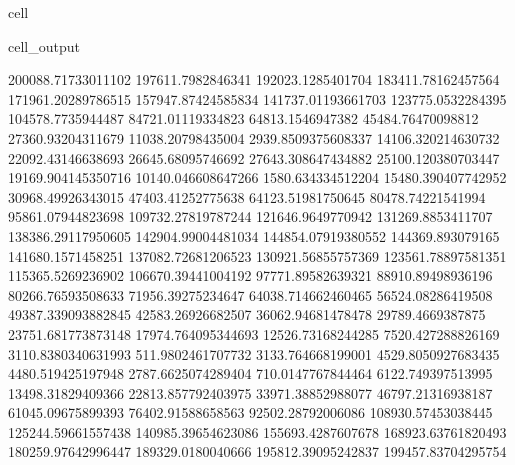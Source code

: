 \documentclass[letterpaper,10pt,english]{jupyterBook}
\begin{document}
\begin{sphinxuseclass}{cell}
\begin{sphinxVerbatimOutput}
\begin{sphinxuseclass}{cell_output}
\begin{sphinxVerbatim}[commandchars=\\\{\}]
200088.71733011102  197611.7982846341  192023.1285401704  183411.78162457564  171961.20289786515  157947.87424585834  141737.01193661703  123775.0532284395  104578.7735944487  84721.01119334823  64813.1546947382  45484.76470098812  27360.93204311679  11038.20798435004  \PYGZhy{}2939.8509375608337  \PYGZhy{}14106.320214630732  \PYGZhy{}22092.43146638693  \PYGZhy{}26645.68095746692  \PYGZhy{}27643.308647434882  \PYGZhy{}25100.120380703447  \PYGZhy{}19169.904145350716  \PYGZhy{}10140.046608647266  1580.634334512204  15480.390407742952  30968.49926343015  47403.41252775638  64123.51981750645  80478.74221541994  95861.07944823698  109732.27819787244  121646.9649770942  131269.8853411707  138386.29117950605  142904.99004481034  144854.07919380552  144369.893079165  141680.1571458251  137082.72681206523  130921.56855757369  123561.78897581351  115365.5269236902  106670.39441004192  97771.89582639321  88910.89498936196  80266.76593508633  71956.39275234647  64038.714662460465  56524.08286419508  49387.339093882845  42583.26926682507  36062.94681478478  29789.4669387875  23751.681773873148  17974.764095344693  12526.73168244285  7520.427288826169  3110.8380340631993  \PYGZhy{}511.9802461707732  \PYGZhy{}3133.764668199001  \PYGZhy{}4529.8050927683435  \PYGZhy{}4480.519425197948  \PYGZhy{}2787.6625074289404  710.0147767844464  6122.749397513995  13498.31829409366  22813.857792403975  33971.38852988077  46797.21316938187  61045.09675899393  76402.91588658563  92502.28792006086  108930.57453038445  125244.59661557438  140985.39654623086  155693.4287607678  168923.63761820493  180259.97642996447  189329.0180040666  195812.39095242837  199457.83704295754  

\end{sphinxVerbatim}
\end{sphinxuseclass}
\end{sphinxVerbatimOutput}
\end{sphinxuseclass}
\end{document}
